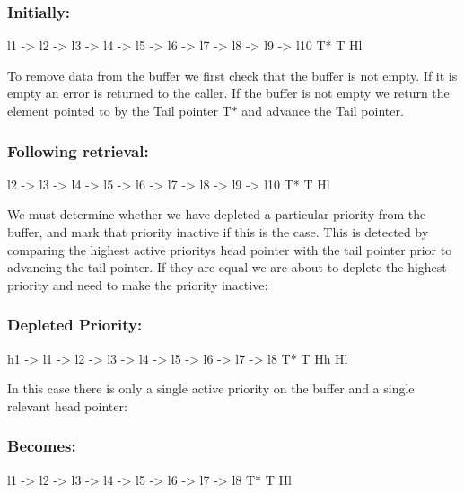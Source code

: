 \subsubsection*{Initially\+:}


\begin{DoxyCode}
l1  ->  l2  ->  l3  ->  l4  ->   l5  ->  l6  ->  l7  ->  l8  ->  l9  ->  l10
T*                                                                       T
                                                                         Hl
\end{DoxyCode}


To remove data from the buffer we first check that the buffer is not empty. If it is empty an error is returned to the caller. If the buffer is not empty we return the element pointed to by the Tail pointer T$\ast$ and advance the Tail pointer.

\subsubsection*{Following retrieval\+:}


\begin{DoxyCode}
l2  ->  l3  ->  l4  ->   l5  ->  l6  ->  l7  ->  l8  ->  l9  ->  l10
T*                                                               T
                                                                 Hl
\end{DoxyCode}


We must determine whether we have depleted a particular priority from the buffer, and mark that priority inactive if this is the case. This is detected by comparing the highest active priority\textquotesingle{}s head pointer with the tail pointer prior to advancing the tail pointer. If they are equal we are about to deplete the highest priority and need to make the priority inactive\+:

\subsubsection*{Depleted Priority\+:}


\begin{DoxyCode}
h1  ->  l1  ->  l2  ->  l3  ->  l4  ->   l5  ->  l6  ->  l7  ->  l8
T*                                                               T
Hh                                                               Hl
\end{DoxyCode}


In this case there is only a single active priority on the buffer and a single relevant head pointer\+:

\subsubsection*{Becomes\+:}


\begin{DoxyCode}
l1  ->  l2  ->  l3  ->  l4  ->   l5  ->  l6  ->  l7  ->  l8
T*                                                       T
                                                         Hl
\end{DoxyCode}
 